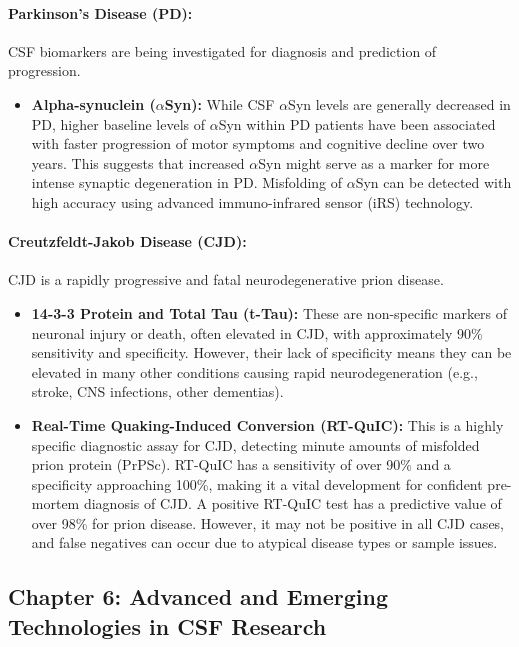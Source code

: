 	\paragraph{Parkinson's Disease (PD):} CSF biomarkers are being investigated for diagnosis and prediction of progression.
	\begin{itemize}
		\item \textbf{Alpha-synuclein ($\alpha$Syn):} While CSF $\alpha$Syn levels are generally decreased in PD, higher baseline levels of $\alpha$Syn within PD patients have been associated with faster progression of motor symptoms and cognitive decline over two years. This suggests that increased $\alpha$Syn might serve as a marker for more intense synaptic degeneration in PD. Misfolding of $\alpha$Syn can be detected with high accuracy using advanced immuno-infrared sensor (iRS) technology.
	\end{itemize}
	
	\paragraph{Creutzfeldt-Jakob Disease (CJD):} CJD is a rapidly progressive and fatal neurodegenerative prion disease.
	\begin{itemize}
		\item \textbf{14-3-3 Protein and Total Tau (t-Tau):} These are non-specific markers of neuronal injury or death, often elevated in CJD, with approximately 90\% sensitivity and specificity. However, their lack of specificity means they can be elevated in many other conditions causing rapid neurodegeneration (e.g., stroke, CNS infections, other dementias).
		\item \textbf{Real-Time Quaking-Induced Conversion (RT-QuIC):} This is a highly specific diagnostic assay for CJD, detecting minute amounts of misfolded prion protein (PrPSc). RT-QuIC has a sensitivity of over 90\% and a specificity approaching 100\%, making it a vital development for confident pre-mortem diagnosis of CJD. A positive RT-QuIC test has a predictive value of over 98\% for prion disease. However, it may not be positive in all CJD cases, and false negatives can occur due to atypical disease types or sample issues.
	\end{itemize}
	
	\subsection*{Chapter 6: Advanced and Emerging Technologies in CSF Research}
	
